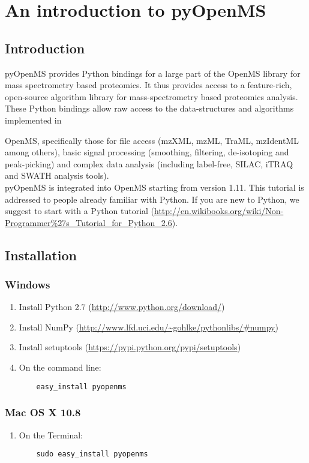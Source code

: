 
\newpage
\section{An introduction to pyOpenMS}

\subsection{Introduction}
pyOpenMS provides Python bindings for a large part of the OpenMS library for mass spectrometry based proteomics. It thus provides access to a feature-rich, open-source algorithm library for mass-spectrometry based proteomics analysis. These Python bindings allow raw access to the data-structures and algorithms implemented in {OpenMS, specifically those for file access (mzXML, mzML, TraML, mzIdentML among others), basic signal processing (smoothing, filtering, de-isotoping and peak-picking) and complex data analysis (including label-free, SILAC, iTRAQ and SWATH analysis tools).\\

pyOpenMS is integrated into OpenMS starting from version 1.11. This tutorial is addressed to people already familiar with Python. If you are new to Python, we suggest to start with a Python tutorial (\url{http://en.wikibooks.org/wiki/Non-Programmer%27s_Tutorial_for_Python_2.6}).

\subsection{Installation}
\subsubsection{Windows}
\begin{enumerate}
  \item Install Python 2.7 (\url{http://www.python.org/download/})
  \item Install NumPy (\url{http://www.lfd.uci.edu/~gohlke/pythonlibs/#numpy})
  \item Install setuptools (\url{https://pypi.python.org/pypi/setuptools})
  \item On the command line:
    \begin{lstlisting}
    easy_install pyopenms
    \end{lstlisting}
\end{enumerate}

\subsubsection{Mac OS X 10.8}
\begin{enumerate}
  \item On the Terminal:
    \begin{lstlisting}
    sudo easy_install pyopenms
    \end{lstlisting}
\end{enumerate}

}
